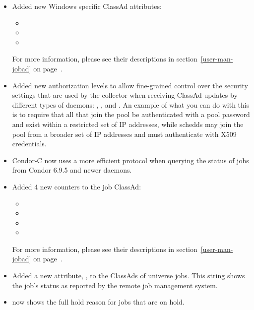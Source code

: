 \begin{itemize}

\item Added new Windows specific ClassAd attributes:
 \begin{itemize}
 \item {}
 \item {}
 \item {}
 \end{itemize}
For more information, please see their descriptions in 
section~\ref{user-man-jobad} on page~\pageref{user-man-jobad}.

\item Added new authorization levels to allow fine-grained control
over the security settings that are used by the collector when
receiving ClassAd updates by different types of daemons:
, , and
.  An example of what you can do with this
is to require that all  that join the pool be
authenticated with a pool password and exist within a restricted set
of IP addresses, while schedds may join the pool from a broader set
of IP addresses and must authenticate with X509 credentials.

\item Condor-C now uses a more efficient protocol when querying the
status of jobs from Condor 6.9.5 and newer  daemons.

\item Added 4 new counters to the job ClassAd:
 \begin{itemize}
 \item {}
 \item {}
 \item {}
 \item {}
 \end{itemize}
For more information, please see their descriptions in
section~\ref{user-man-jobad} on page~\pageref{user-man-jobad}.

\item Added a new attribute, , to the ClassAds of
 universe jobs. This string shows the job's status as reported
by the remote job management system.

\item {}  now shows the full hold reason for jobs
that are on hold.


\end{itemize}
